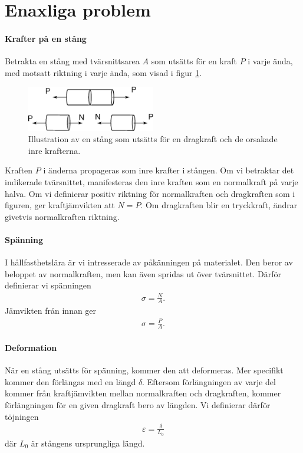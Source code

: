 \section{Enaxliga problem}

\paragraph{Krafter på en stång}
Betrakta en stång med tvärsnittsarea $A$ som utsätts för en kraft $P$ i varje ända, med motsatt riktning i varje ända, som visad i figur \ref{fig:cylinder_forces}.
\begin{figure}[!ht]
	\centering
	\includegraphics[width = 0.5\textwidth]{./Images/cylinder_forces.eps}
	\caption{Illustration av en stång som utsätts för en dragkraft och de orsakade inre krafterna.}
	\label{fig:cylinder_forces}
\end{figure}

Kraften $P$ i änderna propageras som inre krafter i stången. Om vi betraktar det indikerade tvärsnittet, manifesteras den inre kraften som en normalkraft på varje halva. Om vi definierar positiv riktning för normalkraften och dragkraften som i figuren, ger kraftjämvikten att $N = P$. Om dragkraften blir en tryckkraft, ändrar givetvis normalkraften riktning.

\paragraph{Spänning}
I hållfasthetslära är vi intresserade av påkänningen på materialet. Den beror av beloppet av normalkraften, men kan även spridas ut över tvärsnittet. Därför definierar vi spänningen
\begin{align*}
	\sigma = \frac{N}{A}.
\end{align*}
Jämvikten från innan ger
\begin{align*}
	\sigma = \frac{P}{A}.
\end{align*}

\paragraph{Deformation}
När en stång utsätts för spänning, kommer den att deformeras. Mer specifikt kommer den förlängas med en längd $\delta$. Eftersom förlängningen av varje del kommer från kraftjämvikten mellan normalkraften och dragkraften, kommer förlängningen för en given dragkraft bero av längden. Vi definierar därför töjningen
\begin{align*}
	\varepsilon	= \frac{\delta}{L_{0}}
\end{align*}
där $L_{0}$ är stångens ursprungliga längd.

